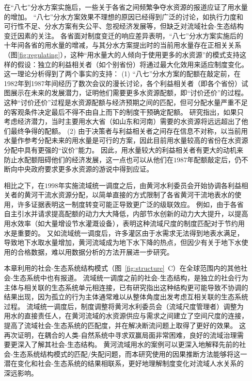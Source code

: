 在“八七”分水方案实施后，一些关于各省之间频繁争夺水资源的报道应证了用水量的增加。
“八七”分水方案效果不理想的原因已经得到广泛的讨论，如执行力度和可行性不足、分水方案有失公平、忽视经济发展等，但缺乏对流域社会-生态结构变迁因素的关注。  %
各省面对制度变迁的响应差异表明，“八七”分水方案实施后的十年间各省的用水量的增减，与其分水方案提出时的当前用水量存在正相关关系（图\ref{fig:regulating}），这种“用水量大的人倾向于使用更多的水资源”的模式支持这样的假设：独立的利益相关者（如个别省份）将通过最大化效用来适应制度变化。
这一理论分析得到了两个事实的支持：
(1) “八七”分水方案的配额在敲定前，在1982年到1987年间经历了数次会议的漫长讨论，各个利益相关者（即各个省份）试图展示在未来的发展潜力，证明他们需要更多水资源配额，即“讨价还价”的过程\cite{wang2019a, wang2019d}。
这种“讨价还价”过程是水资源配额与经济预期之间的匹配，但可分配水量严重不足的客观条件决定最后不得不由自上而下的制度干预确定配额。
研究指出，如果只考虑经济潜力，当时主要用水大省（如山东和河南）需要的水资源将远远超出了他们最终争得的配额\cite{zuo2020}。
(2) 由于决策者与利益相关者之间存在信息不对称，以当前用水量作参考分配未来的用水量是可行的方案，因此目前用水量较高的省份在水资源分配中具有更强的“议价”能力。
因此，用水量较大的利益相关者有更大的动机来防止水配额阻碍他们的经济发展，这一点也可以从他们在$1987$年配额敲定后，仍不断向中央政府要求更多水资源的游说中得到应证\cite{wang2019a, wang2019d}。


相比之下，在$1998$年实施流域统一调度之后，由黄河水利委员会开始协调各利益相关者的黄河干流水资源分配，以简单直接的方式限制了各省黄河干流地表水的使用，许多证据表明这一制度转变可能正导致更广泛的级联效应。
例如，由于各省自主引水并请求提高配额的动力大大降低，内部节水创新的动力大大提升，以提高用水效率（如大量增设节水灌溉设备），表明这种流域尺度的制度匹配对于节约用水是重要的\cite{krieger1955, ostrom1990}。
又如流域统一调度后，许多灌区由于水需求无法得到地表水满足，导致地下水取水量增加，黄河流域成为地下水下降的热点\cite{sun2022b}，但因少有关于地下水使用的合格数据，难以用数据分析的方法开展进一步研究。

本章利用的社会-生态系统结构模式（图~\ref{fig:structure}~C）在全球范围内的其他社会-生态系统中也有报道。
流域统一调度之前的社会-生态结构，是独立的社会行为主体与相关联的生态系统单元相连接，已有研究指出这种结构更可能导致不协调的结果出现，因为孤立的行为主体通常难以从整体角度出发考虑互相关联的生态系统过程\cite{sayles2017,sayles2019,cai2016,bergsten2019}。
流域统一调度后，制度调整将黄河水利委员会（流域尺度管理者）调整为用水的直接责任人，在黄河流域的水资源供应与需求之间建立了空间尺度的连接，提高了流域社会-生态系统的匹配度，并在解决断流问题上取得了更好的效果\cite{cumming2020a,wang2019d}。
这再次证明，在耦合的人类-自然系统中寻求双赢局面非常困难\cite{hegwood2022}，良好的流域治理需要更深入了解其社会-生态结构\cite{bergsten2019, sayles2019}。
黄河流域用水的案例可以更深入地解释先前的社会-生态系统结构模式的匹配/失配问题，而本研究使用的因果推断方法能够将这一潜在变化和社会-生态系统的结果相联系，更好地理解制度变化对流域人水关系的深远影响。

